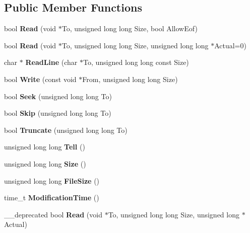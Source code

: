 \subsection*{\-Public \-Member \-Functions}
\begin{DoxyCompactItemize}
\item 
bool {\bfseries \-Read} (void $\ast$\-To, unsigned long long \-Size, bool \-Allow\-Eof)\label{classFileFd_acc1df883c5d1e2881c25e1beb7f40202}

\item 
bool {\bfseries \-Read} (void $\ast$\-To, unsigned long long \-Size, unsigned long long $\ast$\-Actual=0)\label{classFileFd_a533e66bc902c528c0710a477c886b9a3}

\item 
char $\ast$ {\bfseries \-Read\-Line} (char $\ast$\-To, unsigned long long const \-Size)\label{classFileFd_ab38ee7facb05c4733b5e27ee15f9c6e5}

\item 
bool {\bfseries \-Write} (const void $\ast$\-From, unsigned long long \-Size)\label{classFileFd_a7bc53dcd0f697a3584fb5ee40f236ccc}

\item 
bool {\bfseries \-Seek} (unsigned long long \-To)\label{classFileFd_a7f475414ba8b8b863a2e9e9eea0c720d}

\item 
bool {\bfseries \-Skip} (unsigned long long \-To)\label{classFileFd_a1cd68ef7ac85a03816110b883d0f716d}

\item 
bool {\bfseries \-Truncate} (unsigned long long \-To)\label{classFileFd_a8c2631a696f6ac7d39e7d909cd4956a6}

\item 
unsigned long long {\bfseries \-Tell} ()\label{classFileFd_a7bf212ea2604e780ef1e68ec06827b34}

\item 
unsigned long long {\bfseries \-Size} ()\label{classFileFd_aed932b1aeb338009c8390f5322ac228a}

\item 
unsigned long long {\bfseries \-File\-Size} ()\label{classFileFd_a49f682f3c92761067ce1829a78d21909}

\item 
time\-\_\-t {\bfseries \-Modification\-Time} ()\label{classFileFd_ac3ef41c2b15c1d57fd9bcf913ccc5aa0}

\item 
\-\_\-\-\_\-deprecated bool {\bfseries \-Read} (void $\ast$\-To, unsigned long long \-Size, unsigned long $\ast$\-Actual)\label{classFileFd_a1f0bff0a95ba8f6f456d9ed8fb66e089}


\end{DoxyCompactItemize}
